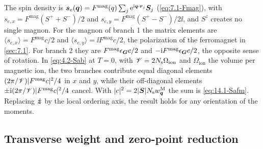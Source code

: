 The spin density is $\bm{s}_e(\bm{q}) = F^{\mathrm{mag}}(q)\sum_j\mathrm{e}^{\mathrm{i}\bm{q}\cdot\bm{r}_j}\bm{S}_j$ (\cref{eq:7.1-Fmag}), with $s_{e,x} = F^{\mathrm{mag}}(S^+ + S^-)/2$ and $s_{e,y} = F^{\mathrm{mag}}(S^+ - S^-)/2\ii$, and $S^z$ creates no single magnon. For the magnon of branch 1 the matrix elements are $\langle s_{e,x}\rangle = F^{\mathrm{mag}}c/2$ and $\langle s_{e,y}\rangle = \ii F^{\mathrm{mag}}c/2$, the polarization of the ferromagnet in \cref{sec:7.1}. For branch 2 they are $F^{\mathrm{mag}}\epsilon_{\bm{G}}c/2$ and $-\mathrm{i} F^{\mathrm{mag}}\epsilon_{\bm{G}}c/2$, the opposite sense of rotation. In \cref{eq:4.2-Sab} at $T = 0$, with $\mathscr{V} = 2N_{\mathrm{s}}\Omega_{\mathrm{ion}}$ and $\Omega_{\mathrm{ion}}$ the volume per magnetic ion, the two branches contribute equal diagonal elements $(2\pi/\mathscr{V})|F^{\mathrm{mag}}c|^2/4$ in $x$ and $y$, while their off-diagonal elements $\pm\mathrm{i}(2\pi/\mathscr{V})|F^{\mathrm{mag}}c|^2/4$ cancel. With $|c|^2 = 2|\bm{S}|N_{\mathrm{s}}w^{\mathrm{M}}_{\bm{q}}$ the sum is \cref{eq:14.1-Safm}. Replacing $\hat{\bm{z}}$ by the local ordering axis, the result holds for any orientation of the moments.

\subsection*{Transverse weight and zero-point reduction}

